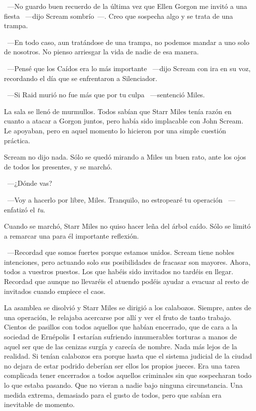 ~---No guardo buen recuerdo de la última vez que Ellen Gorgon me invitó a una fiesta ~---dijo Scream sombrío~---. Creo que sospecha algo y se trata de una trampa.

~---En todo caso, aun tratándose de una trampa, no podemos mandar a uno solo de nosotros. No pienso arriesgar la vida de nadie de esa manera.

~---Pensé que los Caídos era lo más importante ~---dijo Scream con ira en su voz, recordando el día que se enfrentaron a Silenciador.

~---Si Raid murió no fue más que por tu culpa ~---sentenció Miles.

La sala se llenó de murmullos. Todos sabían que Starr Miles tenía razón en cuanto a atacar a Gorgon juntos, pero había sido implacable con John Scream. Le apoyaban, pero en aquel momento lo hicieron por una simple cuestión práctica.

Scream no dijo nada. Sólo se quedó mirando a Miles un buen rato, ante los ojos de todos los presentes, y se marchó.

~---¿Dónde vas?

~---Voy a hacerlo por libre, Miles. Tranquilo, no estropearé tu operación ~---enfatizó el \emph{tu}.

Cuando se marchó, Starr Miles no quiso hacer leña del árbol caído. Sólo se limitó a remarcar una para él importante reflexión.

~---Recordad que somos fuertes porque estamos unidos. Scream tiene nobles intenciones, pero actuando solo sus posibilidades de fracasar son mayores. Ahora, todos a vuestros puestos. Los que habéis sido invitados no tardéis en llegar. Recordad que aunque no llevaréis el atuendo podéis ayudar a evacuar al resto de invitados cuando empiece el caos.

La asamblea se disolvió y Starr Miles se dirigió a los calabozos. Siempre, antes de una operación, le relajaba acercarse por allí y ver el fruto de tanto trabajo. Cientos de pasillos con todos aquellos que habían encerrado, que de cara a la sociedad de Ernépolis~I estarían sufriendo innumerables torturas a manos de aquel ser que de las cenizas surgía y carecía de nombre. Nada más lejos de la realidad. Si tenían calabozos era porque hasta que el sistema judicial de la ciudad no dejara de estar podrido deberían ser ellos los propios jueces. Era una tarea complicada tener encerrados a todos aquellos criminales sin que sospecharan todo lo que estaba pasando. Que no vieran a nadie bajo ninguna circunstancia. Una medida extrema, demasiado para el gusto de todos, pero que sabían era inevitable de momento.

